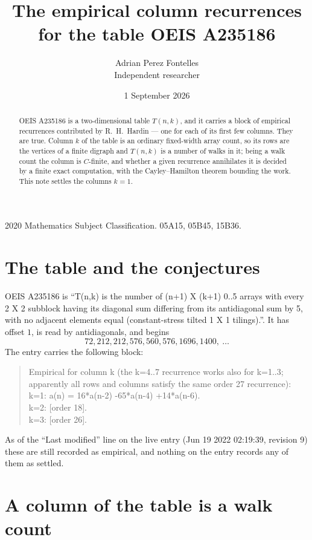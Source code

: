 \documentclass[11pt,a4paper]{article}
\title{The empirical column recurrences for the table OEIS A235186}
\author{Adrian Perez Fontelles\\ \small Independent researcher}
\date{1 September 2026}
\theoremstyle{plain}
\theoremstyle{definition}
\begin{document}
\maketitle

\begin{abstract}
OEIS A235186 is a two-dimensional table $T(n,k)$, and it carries a block of empirical
recurrences contributed by R.~H.~Hardin --- one for each of its first few columns. They are
true. Column $k$ of the table is an ordinary fixed-width array count, so its rows are the
vertices of a finite digraph and $T(n,k)$ is a number of walks in it; being a walk count the
column is $C$-finite, and whether a given recurrence annihilates it is decided by a finite
exact computation, with the Cayley--Hamilton theorem bounding the work. This note settles the columns $k=1$.
\end{abstract}

\noindent\small 2020 Mathematics Subject Classification. 05A15, 05B45, 15B36.\normalsize

\section{The table and the conjectures}

OEIS A235186 is ``T(n,k) is the number of (n+1) X (k+1) 0..5 arrays with every 2 X 2 subblock having its diagonal sum differing from its antidiagonal sum by 5, with no adjacent elements equal (constant-stress tilted 1 X 1 tilings).''. It has offset $1$, is
read by antidiagonals, and begins
\[
72, 212, 212, 576, 560, 576, 1696, 1400,\ \dots
\]
The entry carries the following block:
\begin{quote}\small
Empirical for column k (the k=4..7 recurrence works also for k=1..3; apparently all rows and columns satisfy the same order 27 recurrence):\\
k=1: a(n) = 16*a(n-2) -65*a(n-4) +14*a(n-6).\\
k=2: [order 18].\\
k=3: [order 26].\\
\end{quote}
As of the ``Last modified'' line on the live entry (Jun 19 2022 02:19:39, revision 9) these are still
recorded as empirical, and nothing on the entry records any of them as settled.

\section{A column of the table is a walk count}
\end{document}
